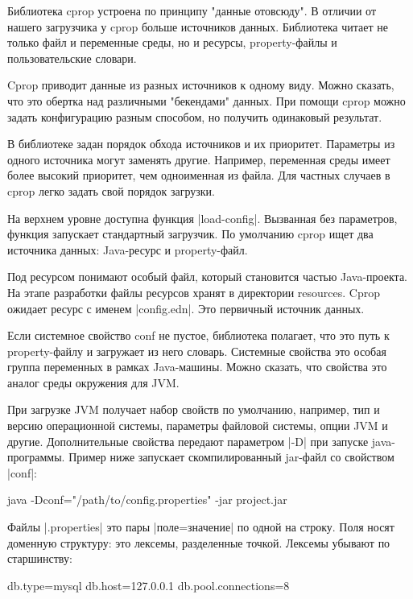 Библиотека cprop устроена по принципу "данные отовсюду". В отличии от нашего
загрузчика у cprop больше источников данных. Библиотека читает не только файл и
переменные среды, но и ресурсы, property-файлы и пользовательские словари.

Cprop приводит данные из разных источников к одному виду. Можно сказать, что это
обертка над различными "бекендами" данных. При помощи cprop можно задать
конфигурацию разным способом, но получить одинаковый результат.

В библиотеке задан порядок обхода источников и их приоритет. Параметры из одного
источника могут заменять другие. Например, переменная среды имеет более высокий
приоритет, чем одноименная из файла. Для частных случаев в cprop легко задать
свой порядок загрузки.

На верхнем уровне доступна функция \spverb|load-config|. Вызванная без параметров,
функция запускает стандартный загрузчик. По умолчанию cprop ищет два источника
данных: Java-ресурс и property-файл.

Под ресурсом понимают особый файл, который становится частью Java-проекта. На
этапе разработки файлы ресурсов хранят в директории resources. Cprop ожидает
ресурс с именем \spverb|config.edn|. Это первичный источник данных.

Если системное свойство conf не пустое, библиотека полагает, что это путь к
property-файлу и загружает из него словарь. Системные свойства это особая группа
переменных в рамках Java-машины. Можно сказать, что свойства это аналог среды
окружения для JVM.

При загрузке JVM получает набор свойств по умолчанию, например, тип и версию
операционной системы, параметры файловой системы, опции JVM и
другие. Дополнительные свойства передают параметром \spverb|-D| при запуске
java-программы. Пример ниже запускает скомпилированный jar-файл со свойством
\spverb|conf|:

\begin{code}
java -Dconf="/path/to/config.properties" -jar project.jar
\end{code}

Файлы \spverb|.properties| это пары \spverb|поле=значение| по одной на строку. Поля носят
доменную структуру: это лексемы, разделенные точкой. Лексемы убывают по
старшинству:

\begin{code}
db.type=mysql
db.host=127.0.0.1
db.pool.connections=8
\end{code}

